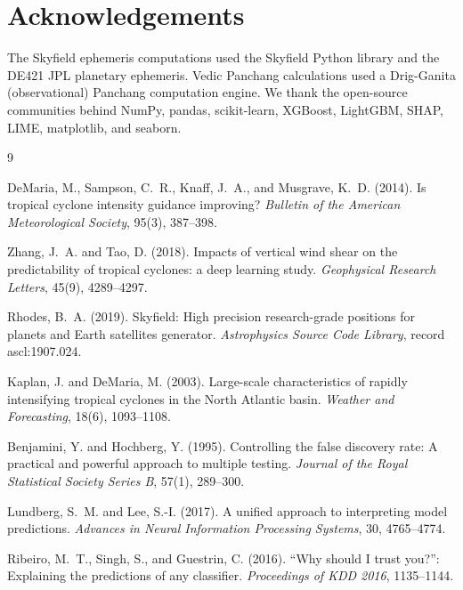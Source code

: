\documentclass[12pt,a4paper]{article}
\begin{document}
\section*{Acknowledgements}

The Skyfield ephemeris computations used the Skyfield Python library and the
DE421 JPL planetary ephemeris. Vedic Panchang calculations used a Drig-Ganita
(observational) Panchang computation engine. We thank the open-source communities
behind NumPy, pandas, scikit-learn, XGBoost, LightGBM, SHAP, LIME, matplotlib,
and seaborn.


\begin{thebibliography}{9}

DeMaria, M., Sampson, C.~R., Knaff, J.~A., and Musgrave, K.~D. (2014).
Is tropical cyclone intensity guidance improving?
\textit{Bulletin of the American Meteorological Society}, 95(3), 387--398.

Zhang, J.~A. and Tao, D. (2018).
Impacts of vertical wind shear on the predictability of tropical cyclones:
a deep learning study.
\textit{Geophysical Research Letters}, 45(9), 4289--4297.

Rhodes, B.~A. (2019).
Skyfield: High precision research-grade positions for planets and Earth satellites
generator.
\textit{Astrophysics Source Code Library}, record ascl:1907.024.

Kaplan, J. and DeMaria, M. (2003).
Large-scale characteristics of rapidly intensifying tropical cyclones in the
North Atlantic basin.
\textit{Weather and Forecasting}, 18(6), 1093--1108.

Benjamini, Y. and Hochberg, Y. (1995).
Controlling the false discovery rate: A practical and powerful approach to
multiple testing.
\textit{Journal of the Royal Statistical Society Series B}, 57(1), 289--300.

Lundberg, S.~M. and Lee, S.-I. (2017).
A unified approach to interpreting model predictions.
\textit{Advances in Neural Information Processing Systems}, 30, 4765--4774.

Ribeiro, M.~T., Singh, S., and Guestrin, C. (2016).
``Why should I trust you?'': Explaining the predictions of any classifier.
\textit{Proceedings of KDD 2016}, 1135--1144.

\end{thebibliography}
\end{document}
